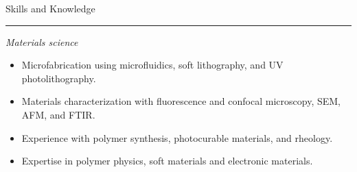 \documentclass[10pt]{article}
\newcommand{\bigsection}[1]{	
	\vspace{4pt}
	{\fontfamily{phv}\selectfont\Large#1}

	\vspace{-10pt} \rule{\textwidth}{1pt}
}
\begin{document}

\pagebreak

\bigsection{Skills and Knowledge}

\vspace{-10pt}

\textit{Materials science}
\begin{itemize}\setlength{\itemsep}{0cm}
  \setlength{\parskip}{0cm}

		\item Microfabrication using microfluidics, soft lithography, and UV photolithography.
		\item Materials characterization with fluorescence and confocal microscopy, SEM, AFM, and FTIR.
		\item Experience with polymer synthesis, photocurable materials, and rheology.
		\item Expertise in polymer physics, soft materials and electronic materials.
\end{itemize}
\end{document}
